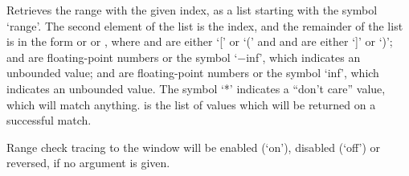   Retrieves the range with the given index, as a list starting with the symbol `range'.
  The second element of the list is the index, and the remainder of the list is in the form
   or   or ,
  where  and  are either `[' or `(' and  and 
  are either `]' or `)';  and  are floating-point numbers or the symbol `$-$inf',
  which indicates an unbounded value;  and  are floating-point numbers or
  the symbol `inf', which indicates an unbounded value.
  The symbol `*' indicates a ``don't care'' value, which will match anything.
   is the list of values which will be returned on a successful match.

  Range check tracing to the \MaxName{} window will be enabled (`on'), disabled (`off') or reversed,
  if no argument is given.
  
  \objListCmdEnd

\objItemFile[]

